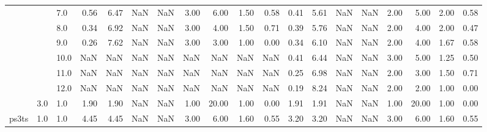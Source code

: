 \begin{tabular}{lllrrrrrrrrrrrrrrrr}
      &     & 7.0  &      0.56 &       6.47 &               NaN &                NaN & 3.00 &   6.00 &             1.50 &                         0.58 &      0.41 &       5.61 &               NaN &                NaN & 2.00 &   5.00 &             2.00 &                         0.58 \\
      &     & 8.0  &      0.34 &       6.92 &               NaN &                NaN & 3.00 &   4.00 &             1.50 &                         0.71 &      0.39 &       5.76 &               NaN &                NaN & 2.00 &   4.00 &             2.00 &                         0.47 \\
      &     & 9.0  &      0.26 &       7.62 &               NaN &                NaN & 3.00 &   3.00 &             1.00 &                         0.00 &      0.34 &       6.10 &               NaN &                NaN & 2.00 &   4.00 &             1.67 &                         0.58 \\
      &     & 10.0 &       NaN &        NaN &               NaN &                NaN &  NaN &    NaN &              NaN &                          NaN &      0.41 &       6.44 &               NaN &                NaN & 3.00 &   5.00 &             1.25 &                         0.50 \\
      &     & 11.0 &       NaN &        NaN &               NaN &                NaN &  NaN &    NaN &              NaN &                          NaN &      0.25 &       6.98 &               NaN &                NaN & 2.00 &   3.00 &             1.50 &                         0.71 \\
      &     & 12.0 &       NaN &        NaN &               NaN &                NaN &  NaN &    NaN &              NaN &                          NaN &      0.19 &       8.24 &               NaN &                NaN & 2.00 &   2.00 &             1.00 &                         0.00 \\
      & 3.0 & 1.0  &      1.90 &       1.90 &               NaN &                NaN & 1.00 &  20.00 &             1.00 &                         0.00 &      1.91 &       1.91 &               NaN &                NaN & 1.00 &  20.00 &             1.00 &                         0.00 \\
ps3ts & 1.0 & 1.0  &      4.45 &       4.45 &               NaN &                NaN & 3.00 &   6.00 &             1.60 &                         0.55 &      3.20 &       3.20 &               NaN &                NaN & 3.00 &   6.00 &             1.60 &                         0.55 \\

\end{tabular}
